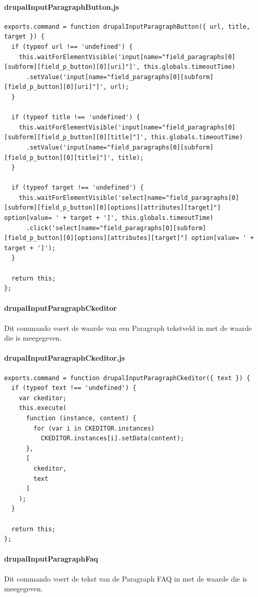 \paragraph{drupalInputParagraphButton.js}
\begin{lstlisting}[breaklines=true]
exports.command = function drupalInputParagraphButton({ url, title, target }) {
  if (typeof url !== 'undefined') {
    this.waitForElementVisible('input[name="field_paragraphs[0][subform][field_p_button][0][uri]"]', this.globals.timeoutTime)
      .setValue('input[name="field_paragraphs[0][subform][field_p_button][0][uri]"]', url);
  }

  if (typeof title !== 'undefined') {
    this.waitForElementVisible('input[name="field_paragraphs[0][subform][field_p_button][0][title]"]', this.globals.timeoutTime)
      .setValue('input[name="field_paragraphs[0][subform][field_p_button][0][title]"]', title);
  }

  if (typeof target !== 'undefined') {
    this.waitForElementVisible('select[name="field_paragraphs[0][subform][field_p_button][0][options][attributes][target]"] option[value= ' + target + ']', this.globals.timeoutTime)
      .click('select[name="field_paragraphs[0][subform][field_p_button][0][options][attributes][target]"] option[value= ' + target + ']');
  }

  return this;
};
\end{lstlisting}


\clearpage
\paragraph{drupalInputParagraphCkeditor}
\label{commando16}
Dit commando voert de waarde van een Paragraph tekstveld in met de waarde die is meegegeven.
\paragraph{drupalInputParagraphCkeditor.js}
\begin{lstlisting}[breaklines=true]
exports.command = function drupalInputParagraphCkeditor({ text }) {
  if (typeof text !== 'undefined') {
    var ckeditor;
    this.execute(
      function (instance, content) {
        for (var i in CKEDITOR.instances)
          CKEDITOR.instances[i].setData(content);
      },
      [
        ckeditor,
        text
      ]
    );
  }

  return this;
};
\end{lstlisting}


\clearpage
\paragraph{drupalInputParagraphFaq}
\label{commando17}
Dit commando voert de tekst van de Paragraph FAQ in met de waarde die is meegegeven.
